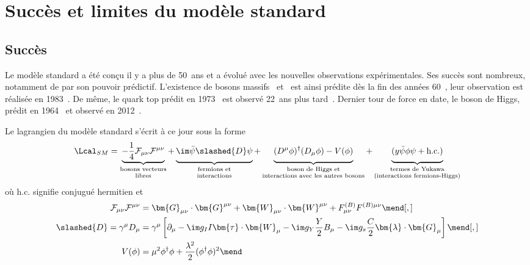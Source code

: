 \section{Succès et limites du modèle standard}\label{chapter-MS-MSSM-section-succes_limites}
\subsection{Succès}\label{chapter-MS-MSSM-section-succes_limites-subsec-succes}
Le modèle standard a été conçu il y a plus de 50~ans et a évolué avec les nouvelles observations expérimentales.
Ses succès sont nombreux, notamment de par son pouvoir prédictif.
L'existence de bosons massifs \Wboson\ et \Zboson\ est ainsi prédite dès la fin des années 60~\cite{Weinberg_leptons_model}, leur observation est réalisée en 1983~\cite{Wboson_discovery1,Wboson_discovery2,Zboson_discovery1,Zboson_discovery2,Wboson_discovery3}.
De même, le quark top prédit en 1973~\cite{CKM_KM} est observé 22~ans plus tard~\cite{top_discovery1,top_discovery2}.
Dernier tour de force en date, le boson de Higgs, prédit en 1964~\cite{Englert_Brout,Higgs_1,Higgs_2,Guralnik_Hagen_Kibble} et observé en 2012~\cite{ATLAS_Higgs_discovery,CMS_Higgs_discovery}.
\par Le lagrangien du modèle standard s'écrit à ce jour sous la forme
\begin{equation}
\Lcal_{SM} = 
\underbrace{- \frac{1}{4} \mathcal{F}_{\mu\nu}\mathcal{F}^{\mu\nu} \vphantom{\frac{1}{4}}}_{\substack{\text{bosons vecteurs\vphantom{YHg}}\\\text{libres\vphantom{(lHg)}}}}
+ \underbrace{\im \bar{\psi} \slashed{D} \psi \vphantom{\frac{1}{4}}}_{\substack{\text{fermions et\vphantom{YHg}}\\\text{interactions\vphantom{(lHg)}}}}
+ \underbrace{(D^\mu\phi)^\dagger(D_\mu\phi) - V(\phi) \vphantom{\frac{1}{4}}}_{\substack{\text{boson de Higgs et\vphantom{YHg}}\\\text{interactions avec les autres bosons\vphantom{(lHg)}}}}
+ \underbrace{(y \bar{\psi}\phi\psi + \text{h.c.}) \vphantom{\frac{1}{4}}}_{\substack{\text{termes de Yukawa\vphantom{YHg}}\\\text{(interactions fermions-Higgs)\vphantom{(lHg)}}}}
\label{eq-SM_lagrangian}
\end{equation}
où \og $\text{h.c.}$ \fg{} signifie conjugué hermitien et
\begin{align}
\mathcal{F}_{\mu\nu}\mathcal{F}^{\mu\nu} &= \bm{G}_{\mu\nu} \cdot \bm{G}^{\mu\nu} + \bm{W}_{\mu\nu} \cdot \bm{W}^{\mu\nu} + F^{(B)}_{\mu\nu} F^{(B)\mu\nu}
\mend[,]\\
\slashed{D} = \gamma^\mu D_\mu &= \gamma^\mu \left[ \partial_\mu - \im g_I I \bm{\tau}\cdot\bm{W}_\mu - \im g_Y \frac{Y}{2} B_\mu - \im g_s \frac{C}{2} \bm{\lambda}\cdot\bm{G}_\mu \right]
\mend[,]\\
V(\phi) &= \mu^2\phi^\dagger\phi + \frac{\lambda^2}{2} (\phi^\dagger\phi)^2
\mend
\end{align}

